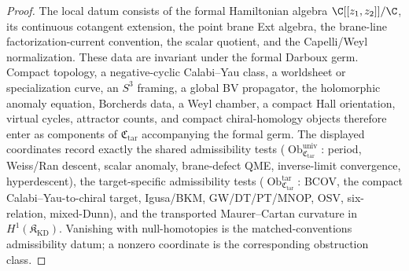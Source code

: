 \begin{proof}
  The local datum consists of the formal Hamiltonian algebra
  \(\C[[z_1,z_2]]/\C\), its continuous cotangent extension, the point
  brane Ext algebra, the brane-line factorization-current convention,
  the scalar quotient, and the Capelli/Weyl normalization.  These data
  are invariant under the formal Darboux germ.  Compact topology, a
  negative-cyclic Calabi--Yau class, a worldsheet or specialization
  curve, an \(S^3\) framing, a global BV propagator, the holomorphic
  anomaly equation, Borcherds data, a Weyl chamber, a compact Hall
  orientation, virtual cycles, attractor counts, and compact
  chiral-homology objects therefore enter as components of
  \(\mathfrak C_{\mathrm{tar}}\) accompanying the formal germ.  The
  displayed coordinates record exactly the shared
  admissibility tests
  (\(\operatorname{Ob}_{\mathfrak C_{\mathrm{tar}}}^{\mathrm{univ}}\):
  period, Weiss/Ran descent, scalar anomaly, brane-defect QME,
  inverse-limit convergence, hyperdescent), the target-specific
  admissibility tests
  (\(\operatorname{Ob}_{\mathfrak C_{\mathrm{tar}}}^{\mathrm{tar}}\):
  BCOV, the compact Calabi--Yau-to-chiral target, Igusa/BKM, GW/DT/PT/MNOP, OSV, six-relation,
  mixed-Dunn), and the transported Maurer--Cartan curvature in
  \(H^1(\mathfrak K_{\mathrm{KD}})\).  Vanishing with null-homotopies
  is the matched-conventions admissibility datum; a nonzero coordinate
  is the corresponding obstruction class.
\end{proof}

